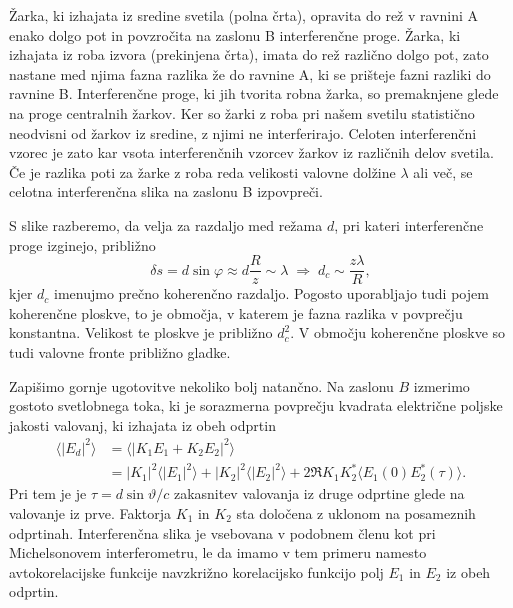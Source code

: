 Žarka, ki izhajata iz sredine svetila (polna črta), 
opravita do rež v ravnini A enako dolgo pot in povzročita na zaslonu B 
interferenčne proge. Žarka, ki izhajata iz roba izvora (prekinjena črta), 
imata do rež različno dolgo pot, zato nastane med njima fazna razlika že do ravnine A, 
ki se prišteje fazni razliki do ravnine B. Interferenčne proge, ki jih tvorita 
robna žarka, so premaknjene glede na proge centralnih žarkov. Ker so žarki z roba
pri našem svetilu statistično neodvisni od žarkov iz sredine, z njimi
ne interferirajo. Celoten interferenčni vzorec je zato kar vsota interferenčnih
vzorcev žarkov iz različnih delov svetila. Če je razlika poti za žarke
z roba reda velikosti valovne dolžine $\lambda$ ali več, se celotna
interferenčna slika na zaslonu B izpovpreči.

S slike razberemo, da
velja za razdaljo med režama $d$, pri kateri interferenčne proge
izginejo, približno 
\begin{equation}
\delta s = d\sin\varphi\approx d\frac{R}{z}\sim\lambda\;\Rightarrow\;
d_{c}\sim\frac{z\lambda}{R},\label{eq:prost_koh}
\end{equation}
kjer $d_{c}$ imenujmo prečno koherenčno razdaljo. Pogosto uporabljajo
tudi pojem koherenčne ploskve, to je območja, 
v katerem je fazna razlika v povprečju konstantna. Velikost te ploskve je približno $d_{c}^{2}$.
V območju koherenčne ploskve so tudi valovne fronte približno gladke.

Zapišimo gornje ugotovitve nekoliko bolj natančno. Na zaslonu $B$
izmerimo gostoto svetlobnega toka, ki je sorazmerna povprečju kvadrata
električne poljske jakosti valovanj, ki izhajata iz obeh odprtin
\begin{align}
\langle|E{}_{d}|^{2}\rangle & =\langle|K_{1}E_{1}+K_{2}E_{2}|^{2}\rangle\nonumber \\
&=  |K_{1}|^{2}\langle|E_{1}|^{2}\rangle+|K_{2}|^{2}\langle|E_{2}|^{2}\rangle+
2\Re K_{1}K_{2}^{*}\langle E_{1}(0)E_{2}^{*}(\tau)\rangle.
\end{align}
Pri tem je je $\tau=d\sin\vartheta/c$ zakasnitev valovanja iz druge odprtine
glede na valovanje iz prve. Faktorja $K_{1}$ in $K_{2}$ sta določena
z uklonom na posameznih odprtinah.
Interferenčna slika je vsebovana v podobnem členu kot pri Michelsonovem
interferometru, le da imamo v tem primeru namesto avtokorelacijske funkcije
navzkrižno korelacijsko funkcijo polj $E_{1}$ in $E_{2}$ iz obeh
odprtin.

